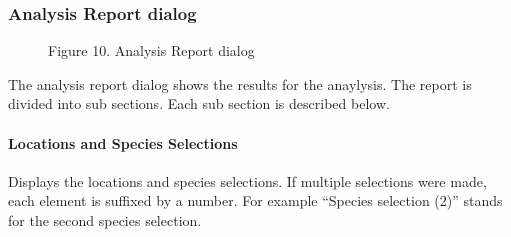 \documentclass[letterpaper,10pt,english]{sphinxmanual}
\begin{document}
\subsubsection{Analysis Report dialog}
\label{user_manual:analysis-report-dialog}\label{user_manual:dialog-analysis-report}\begin{figure}[htbp]
\centering
\capstart

\caption{Figure 10. Analysis Report dialog}\end{figure}

The analysis report dialog shows the results for the anaylysis. The
report is divided into sub sections. Each sub section is described
below.


\paragraph{Locations and Species Selections}
\label{user_manual:locations-and-species-selections}
Displays the locations and species selections. If multiple selections
were made, each element is suffixed by a number. For example ``Species
selection (2)'' stands for the second species selection.
\end{document}
